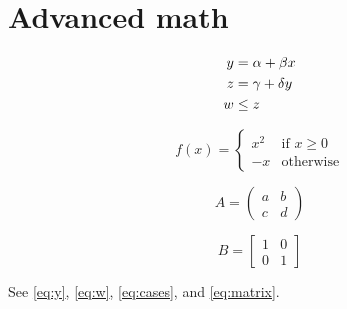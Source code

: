 \documentclass{article}
\begin{document}
\section{Advanced math}

\begin{align}
y &= \alpha + \beta x \label{eq:y} \\
z &= \gamma + \delta y \notag \\
w &\le z \label{eq:w}
\end{align}

\begin{equation}
f(x)=\begin{cases}
x^2 & \text{if } x\ge 0 \\
-x & \text{otherwise}
\end{cases}
\label{eq:cases}
\end{equation}

\begin{equation*}
A=\begin{pmatrix}
a & b \\
c & d
\end{pmatrix}
\end{equation*}

\begin{equation}
B=\begin{bmatrix}
1 & 0 \\
0 & 1
\end{bmatrix}
\label{eq:matrix}
\end{equation}

See \eqref{eq:y}, \eqref{eq:w}, \eqref{eq:cases}, and \eqref{eq:matrix}.
\end{document}
